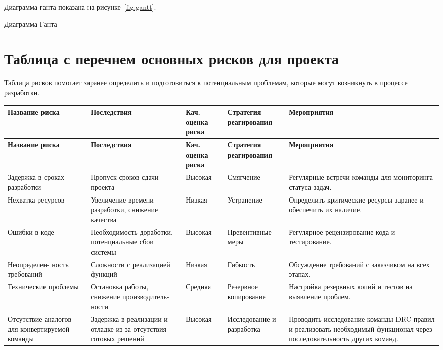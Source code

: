 Диаграмма ганта показана на рисунке~\ref{fig:gantt}.

\begin{image}
	\caption{Диаграмма Ганта}
	\label{fig:gantt}
\end{image}


\section{Таблица с перечнем основных рисков для проекта}

Таблица рисков помогает заранее определить
и подготовиться к потенциальным проблемам,
которые могут возникнуть в процессе разработки.

\begin{longtable}{|p{3.2cm}|p{3.2cm}|p{2cm}|p{3cm}|p{4cm}|}
	\hline
	\textbf{Название риска}
	& \textbf{Последствия}
	& \textbf{Кач. оценка риска}
	& \textbf{Стратегия реагирования}
	& \textbf{Мероприятия} \\ \hline
	\endfirsthead
	\hline
	\textbf{Название риска}
	& \textbf{Последствия}
	& \textbf{Кач. оценка риска}
	& \textbf{Стратегия реагирования}
	& \textbf{Мероприятия} \\ \hline
	\endhead
	Задержка в сроках разработки
	& Пропуск сроков сдачи проекта
	& Высокая
	& Смягчение 
	& Регулярные встречи команды для мониторинга статуса задач. \\ \hline
	Нехватка ресурсов
	& Увеличение времени разработки, снижение качества
	& Низкая
	& Устранение
	& Определить критические ресурсы заранее и обеспечить их наличие. \\ \hline
	Ошибки в коде
	& Необходимость доработки, потенциальные сбои системы
	& Высокая
	& Превентивные меры
	& Регулярное рецензирование кода и тестирование. \\ \hline
	Неопределен- ность требований
	& Сложности с реализацией функций
	& Низкая
	& Гибкость
	& Обсуждение требований с заказчиком на всех этапах. \\ \hline
	Технические проблемы
	& Остановка работы, снижение производитель- ности
	& Средняя
	& Резервное копирование
	& Настройка резервных копий и тестов на выявление проблем. \\ \hline
	Отсутствие аналогов для конвертируемой команды
	& Задержка в реализации и отладке из-за отсутствия готовых решений
	& Высокая
	& Исследование и разработка
	& Проводить исследование команды DRC правил
	и реализовать необходимый функционал через последовательность
	других команд. \\ \hline
\end{longtable}


